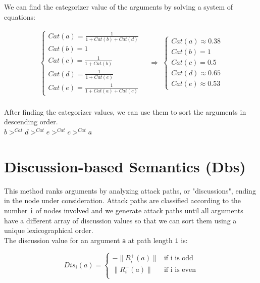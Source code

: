 \documentclass{scrbook}
\begin{document}
We can find the categorizer value of the arguments by solving a system of equations:

\[
    \begin{aligned}
        \begin{cases}
            Cat(a) = \frac{1}{1 + Cat(b) + Cat(d)} \\
            Cat(b) = 1 \\
            Cat(c) = \frac{1}{1 + Cat(b)} \\
            Cat(d) = \frac{1}{1 + Cat(e)} \\
            Cat(e) = \frac{1}{1 + Cat(a) + Cat(c)}
        \end{cases}
        \;&\Rightarrow\;
        \begin{cases}
            Cat(a) \approx 0.38 \\
            Cat(b) = 1 \\
            Cat(c) = 0.5 \\
            Cat(d) \approx 0.65 \\
            Cat(e) \approx 0.53
        \end{cases}
    \end{aligned}
\] \\

After finding the categorizer values, we can use them to sort the arguments in descending order. \\

$b >^{Cat} d >^{Cat} e >^{Cat} c >^{Cat} a$

\section{Discussion-based Semantics (Dbs)}

This method ranks arguments by analyzing attack paths, or "discussions", ending in the node under consideration. Attack paths are classified according to the number \texttt{i} of nodes involved and we generate attack paths until all arguments have a different array of discussion values so that we can sort them using a unique lexicographical order. \\

The discussion value for an argument \texttt{a} at path length \texttt{i} is:

\[
    Dis_i(a) = 
    \begin{cases}
        -\|R_i^+(a)\| & \text{if i is odd} \\
        \|R_i^-(a)\| & \text{if i is even} \\
    \end{cases}
\] \\
\end{document}
